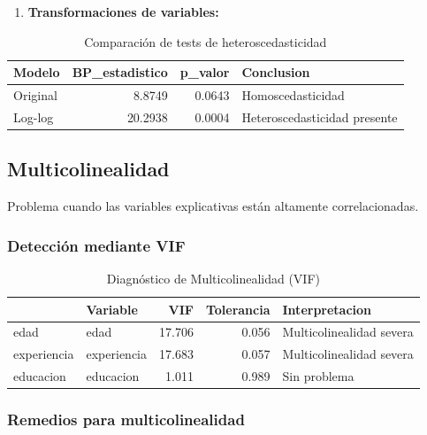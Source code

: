 \documentclass[
  oneside]{book}
\providecommand{\tightlist}{%
  \setlength{\itemsep}{0pt}\setlength{\parskip}{0pt}}
\begin{document}
\begin{enumerate}
\def\labelenumi{\arabic{enumi}.}
\setcounter{enumi}{1}
\tightlist
\item
  \textbf{Transformaciones de variables:}
\end{enumerate}

\begin{table}
\centering
\caption{\label{tab:transformaciones}Comparación de tests de heteroscedasticidad}
\centering
\begin{tabular}[t]{l|r|r|l}
\hline
Modelo & BP\_estadistico & p\_valor & Conclusion\\
\hline
Original & 8.8749 & 0.0643 & Homoscedasticidad\\
\hline
Log-log & 20.2938 & 0.0004 & Heteroscedasticidad presente\\
\hline
\end{tabular}
\end{table}

\subsection{Multicolinealidad}\label{multicolinealidad}

Problema cuando las variables explicativas están altamente correlacionadas.

\subsubsection{Detección mediante VIF}\label{detecciuxf3n-mediante-vif}

\begin{table}
\centering
\caption{\label{tab:multicolinealidad}Diagnóstico de Multicolinealidad (VIF)}
\centering
\begin{tabular}[t]{l|l|r|r|l}
\hline
  & Variable & VIF & Tolerancia & Interpretacion\\
\hline
edad & edad & 17.706 & 0.056 & Multicolinealidad severa\\
\hline
experiencia & experiencia & 17.683 & 0.057 & Multicolinealidad severa\\
\hline
educacion & educacion & 1.011 & 0.989 & Sin problema\\
\hline
\end{tabular}
\end{table}

\subsubsection{Remedios para multicolinealidad}\label{remedios-para-multicolinealidad}
\end{document}

